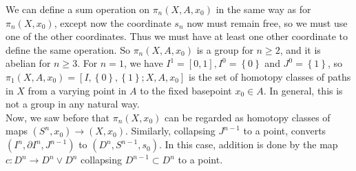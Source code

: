 \documentclass[reqno]{amsart}
\theoremstyle{definition}
\theoremstyle{remark}
\begin{document}
  We can define a sum operation on $\pi_n \left( X, A, x_0 \right) $ 
  in the same way as for $\pi_n \left( X, x_0 \right) $, except
  now the coordinate $s_n$ now must remain free, so
  we must use one of the other coordinates. Thus
  we must have at least one other coordinate to define
  the same operation. So $\pi_n \left( X, A, x_0 \right) $ is
  a group for $n\ge 2$, and it is abelian for
  $n\ge 3$. For $n=1$, we have
  $I^{1} = \left[ 0,1 \right] , I^{0} = \left\{ 0 \right\} $ 
  and $J^{0} = \left\{ 1 \right\} $, so
  $\pi_1 \left( X, A, x_0 \right) 
  = \left[ I, \left\{ 0 \right\} , \left\{ 1 \right\} ;
  X, A, x_0 \right] $ is the set of homotopy classes of paths in
  $X$ from a varying point in $A$ to the fixed basepoint
  $x_0 \in A$. In general, this is not a group in any
  natural way. \\
  \linebreak
  Now, we saw before that
  $\pi_n \left( X, x_0 \right) $ can be regarded as
  homotopy classes of maps $\left( S^{n}, x_0 \right) \to 
  \left( X, x_0 \right) $. Similarly, collapsing
  $J^{n-1}$ to a point, converts
  $\left( I^{n} , \partial I^{n}, J^{n-1} \right) $ 
  to $\left( D^{n}, S^{n-1}, s_0 \right) $.
  In this case, addition is done by
  the map $c \colon D^{n} \to D^{n} \vee D^{n}$ collapsing
  $D^{n-1} \subset D^{n}$ to a point.


  










\newpage

\printbibliography
\end{document}
